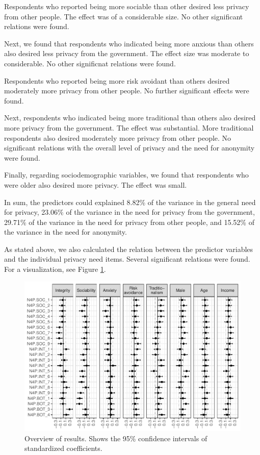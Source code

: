 \documentclass[man,floatsintext]{apa6}
\theoremstyle{definition}
\theoremstyle{definition}
\theoremstyle{definition}
\theoremstyle{remark}
\begin{document}
Respondents who reported being more sociable than other desired less
privacy from other people. The effect was of a considerable size. No
other significant relations were found.

Next, we found that respondents who indicated being more anxious than
others also desired less privacy from the government. The effect size
was moderate to considerable. No other significnat relations were found.

Respondents who reported being more risk avoidant than others desired
moderately more privacy from other people. No further significant
effects were found.

Next, respondents who indicated being more traditional than others also
desired more privacy from the government. The effect was substantial.
More traditional respondents also desired moderately more privacy from
other people. No significant relations with the overall level of privacy
and the need for anonymity were found.

Finally, regarding sociodemographic variables, we found that respondents
who were older also desired more privacy. The effect was small.

In sum, the predictors could explained 8.82\% of the variance in the
general need for privacy, 23.06\% of the variance in the need for
privacy from the government, 29.71\% of the variance in the need for
privacy from other people, and 15.52\% of the variance in the need for
anonymity.

As stated above, we also calculated the relation between the predictor
variables and the individual privacy need items. Several significant
relations were found. For a visualization, see Figure
\ref{fig:results-items}.

\begin{figure}
\centering
\includegraphics{manuscript_files/figure-latex/results-items-1.pdf}
\caption{\label{fig:results-items}Overview of results. Shows the 95\%
confidence intervals of standardized coefficients.}
\end{figure}
\end{document}
